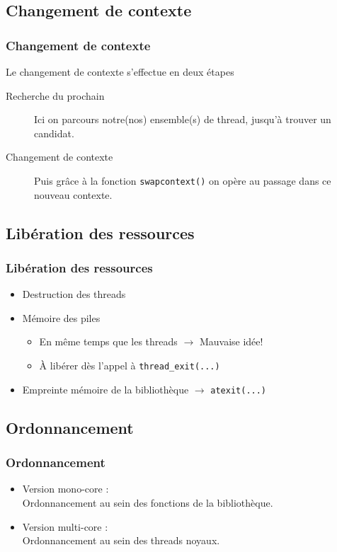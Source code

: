 \documentclass{beamer}
\begin{document}
\subsection{Changement de contexte}

\begin{frame}
  \frametitle{Changement de contexte}
  Le changement de contexte s'effectue en deux étapes
  
  \begin{description}
  \item[Recherche du prochain] Ici on parcours notre(nos) ensemble(s) de thread, jusqu'à trouver un candidat.
  \item[Changement de contexte] Puis grâce à la fonction \verb!swapcontext()! on opère au passage dans ce nouveau contexte.
	
\end{description}

\end{frame}

\subsection{Libération des ressources}

\begin{frame}[containsverbatim]
  \frametitle{Libération des ressources}
  \begin{itemize}
  \item Destruction des threads
  \item Mémoire des piles
    \begin{itemize}
    \item En même temps que les threads $\rightarrow $ Mauvaise idée!
    \item À libérer dès l'appel à \verb!thread_exit(...)!
    \end{itemize}
  \item Empreinte mémoire de la bibliothèque
    $\rightarrow $ \verb!atexit(...)!
  \end{itemize}
\end{frame}

\subsection{Ordonnancement}

\begin{frame}
  \frametitle{Ordonnancement}
  \begin{itemize}
    \item Version mono-core : \\
    Ordonnancement au sein des fonctions de la bibliothèque.
    \item Version multi-core : \\
    Ordonnancement au sein des threads noyaux.
  \end{itemize}
\end{frame}
\end{document}
